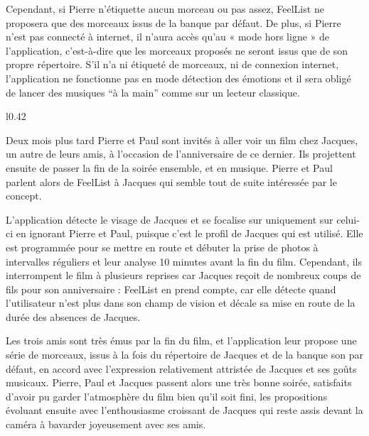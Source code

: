 Cependant, si Pierre n'étiquette aucun morceau ou pas assez, FeelList ne proposera que des morceaux issus de la banque par défaut.
De plus, si Pierre n'est pas connecté à internet, il n'aura accès qu'au « mode hors ligne » de l'application, c'est-à-dire que les morceaux proposés ne seront issus que de son propre répertoire.
S'il n'a ni étiqueté de morceaux, ni de connexion internet, l'application ne fonctionne pas en mode détection des émotions et il sera obligé de lancer des musiques “à la main” comme sur un lecteur classique.\\

\begin{wrapfigure}{l}{0.42\textwidth}
\end{wrapfigure}

Deux mois plus tard Pierre et Paul sont invités à aller voir un film chez Jacques, un autre de leurs amis, à l'occasion de l'anniversaire de ce dernier.
Ils projettent ensuite de passer la fin de la soirée ensemble, et en musique. Pierre et Paul parlent alors de FeelList à Jacques qui semble tout de suite intéressée par le concept.

L'application détecte le visage de Jacques et se focalise sur uniquement sur celui-ci en ignorant Pierre et Paul, puisque c'est le profil de Jacques qui est utilisé.
Elle est programmée pour se mettre en route et débuter la prise de photos à intervalles réguliers et leur analyse 10 minutes avant la fin du film.
Cependant, ils interrompent le film à plusieurs reprises car Jacques reçoit de nombreux coups de fils pour son anniversaire : FeelList en prend compte, car elle détecte quand l’utilisateur n’est plus dans son champ de vision et décale sa mise en route de la durée des absences de Jacques.

Les trois amis sont très émus par la fin du film, et l'application leur propose une série de morceaux, issus à la fois du répertoire de Jacques et de la banque son par défaut, en accord avec l'expression relativement attristée de Jacques et ses goûts musicaux.
Pierre, Paul et Jacques passent alors une très bonne soirée, satisfaits d’avoir pu garder l’atmosphère du film bien qu’il soit fini, les propositions évoluant ensuite avec l'enthousiasme croissant de Jacques qui reste assis devant la caméra à bavarder joyeusement avec ses amis.